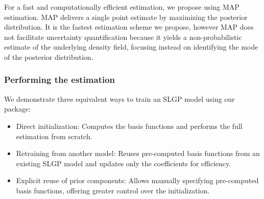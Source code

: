\documentclass[
]{article}
\begin{document}
For a fast and computationally efficient estimation, we propose using MAP estimation. MAP delivers a single point estimate by maximizing the posterior distribution. It is the fastest estimation scheme we propose, however MAP does not facilitate uncertainty quantification because it yields a non-probabilistic estimate of the underlying density field, focusing instead on identifying the mode of the posterior distribution.

\subsubsection{Performing the estimation}\label{performing-the-estimation}

We demonstrate three equivalent ways to train an SLGP model using our package:

\begin{itemize}
\item
  Direct initialization: Computes the basis functions and performs the full estimation from scratch.
\item
  Retraining from another model: Reuses pre-computed basis functions from an existing SLGP model and updates only the coefficients for efficiency.
\item
  Explicit reuse of prior components: Allows manually specifying pre-computed basis functions, offering greater control over the initialization.
\end{itemize}
\end{document}
